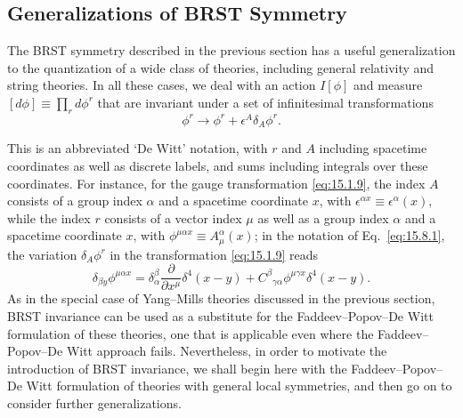 \subsection[Generalizations of BRST Symmetry]{Generalizations of BRST Symmetry\footnotemark}

The BRST symmetry described in the previous section has a useful generalization to the quantization of a wide class of theories, including general relativity and string theories. In all these cases, we deal with an action $I[\phi]$ and measure $[d\phi]\equiv\prod_r d\phi^r$ that are invariant under a set of infinitesimal transformations
\begin{equation}
 \phi^r\longrightarrow\phi^r+\epsilon^A\delta_A\phi^r.
 \tag{15.8.1}\label{eq:15.8.1}
\end{equation}

This is an abbreviated `De Witt' notation, with $r$ and $A$ including spacetime coordinates as well as discrete labels, and sums including integrals over these coordinates. For instance, for the gauge transformation \eqref{eq:15.1.9}, the index $A$ consists of a group index $\alpha$ and a spacetime coordinate $x$, with $\epsilon^{\alpha x}\equiv\epsilon^\alpha(x)$, while the index $r$ consists of a vector index $\mu$ as well as a group index $\alpha$ and a spacetime coordinate $x$, with $\phi^{\mu\alpha x}\equiv A_\mu^\alpha(x)$; in the notation of Eq.~\eqref{eq:15.8.1}, the variation $\delta_A\phi^r$ in the transformation \eqref{eq:15.1.9} reads
\[
 \delta_{\beta y}\phi^{\mu\alpha x}
 =\delta_\alpha^\beta\frac{\partial}{\partial x^\mu}\delta^4(x-y)
 +C^\beta{}_{\gamma\alpha}\phi^{\mu\gamma x}\delta^4(x-y).
\]
As in the special case of Yang--Mills theories discussed in the previous section, BRST invariance can be used as a substitute for the Faddeev--Popov--De Witt formulation of these theories, one that is applicable even where the Faddeev--Popov--De Witt approach fails. Nevertheless, in order to motivate the introduction of BRST invariance, we shall begin here with the Faddeev--Popov--De Witt formulation of theories with general local symmetries, and then go on to consider further generalizations.


